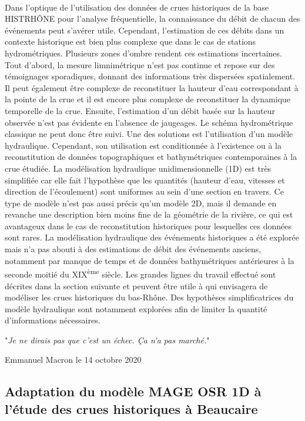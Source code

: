 \documentclass[11pt]{article}
\begin{document}
	\paragraph{} Dans l'optique de l'utilisation des données de crues historiques de la base HISTRHÔNE pour l'analyse fréquentielle, la connaissance du débit de chacun des événements peut s'avérer utile. Cependant, l'estimation de ces débits dans un contexte historique est bien plus complexe que dans le cas de stations hydrométriques. Plusieurs zones d'ombre rendent ces estimations incertaines. Tout d'abord, la mesure limnimétrique n'est pas continue et repose sur des témoignages sporadiques, donnant des informations très dispersées spatialement. Il peut également être complexe de reconstituer la hauteur d'eau correspondant à la pointe de la crue et il est encore plus complexe de reconstituer la dynamique temporelle de la crue. Ensuite, l'estimation d'un débit basée sur la hauteur observée n'est pas évidente en l'absence de jaugeages. Le schéma hydrométrique classique ne peut donc être suivi. Une des solutions est l'utilisation d'un modèle hydraulique. Cependant, son utilisation est conditionnée à l'existence ou à la reconstitution de données topographiques et bathymétriques contemporaines à la crue étudiée. La modélisation hydraulique unidimensionnelle (1D) est très simplifiée car elle fait l'hypothèse que les quantités (hauteur d'eau, vitesses et direction de l'écoulement) sont uniformes au sein d'une section en travers. Ce type de modèle n'est pas aussi précis qu'un modèle 2D, mais il demande en revanche une description bien moins fine de la géométrie de la rivière, ce qui est avantageux dans le cas de reconstitution historiques pour lesquelles ces données sont rares. La modélisation hydraulique des événements historiques a été explorée mais n'a pas abouti à des estimations de débit des événements anciens, notamment par manque de temps et de données bathymétriques antérieures à la seconde moitié du XIX\textsuperscript{ème} siècle. Les grandes lignes du travail effectué sont décrites dans la section suivante et peuvent être utile à qui envisagera de modéliser les crues historiques du bas-Rhône. Des hypothèses simplificatrices du modèle hydraulique sont notamment explorées afin de limiter la quantité d'informations nécessaires.
	
	\epigraph{"\textit{Je ne dirais pas que c'est un échec. Ça n'a pas marché.}"}{Emmanuel Macron le 14 octobre 2020}
	
	 \subsection{Adaptation du modèle MAGE OSR 1D à l'étude des crues historiques à Beaucaire}
	 
\end{document}
